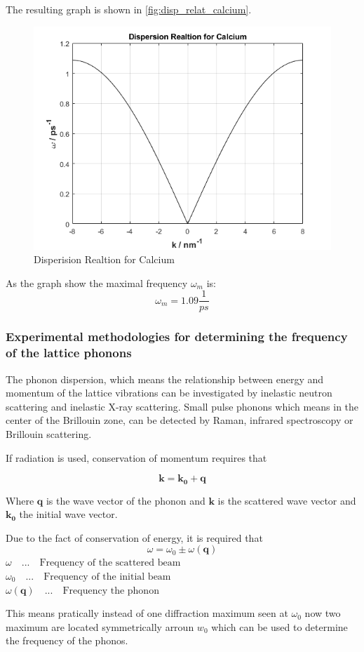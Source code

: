 The resulting graph is shown in \autoref{fig:disp_relat_calcium}.
\begin{figure}[H]
	\centering
	\includegraphics[width=0.6\linewidth]{Graphics/Chapter3/disp_relat_calcium}
	\caption{Disperision Realtion for Calcium}
	\label{fig:disp_relat_calcium}
\end{figure}

As the graph show the maximal frequency $\omega_m$ is:
$$\omega_m = 1.09 \frac{1}{ps}$$

\subsubsection*{Experimental methodologies for determining the frequency of the lattice phonons}

The phonon dispersion, which means the relationship between energy and momentum of the 
lattice vibrations can be investigated by inelastic neutron scattering and inelastic 
X-ray scattering. Small pulse phonons which means in the center of the Brillouin zone, 
can be detected by Raman, infrared spectroscopy or Brillouin scattering.

If radiation is used, conservation of momentum requires that

$$\mathbf{k} = \mathbf{k_0} + \mathbf{q}$$

Where $\mathbf{q}$ is the wave vector of the phonon and $\mathbf{k}$
is the scattered wave vector and $\mathbf{k_0}$ the initial wave vector.

Due to the fact of conservation of energy, it is required that
$$\omega = \omega_0 \pm \omega(\mathbf{q})$$
$\omega  \quad ... \quad \textrm{Frequency of the scattered beam}$\\
$\omega_0  \quad ... \quad \textrm{Frequency of the initial beam}$\\
$\omega(\mathbf{q})  \quad ... \quad \textrm{Frequency the phonon}$

This means pratically instead of one diffraction maximum seen at $\omega_0$ 
now two maximum are located symmetrically arroun $w_0$ which can be used 
to determine the frequency of the phonos.

